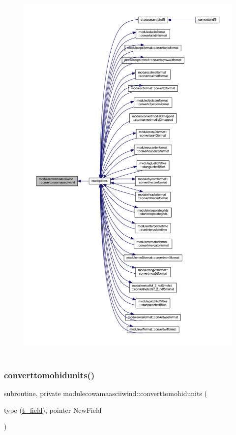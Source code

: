 \begin{figure}[H]
\begin{center}
\leavevmode
\includegraphics[height=550pt]{namespacemodulecowamaasciiwind_a76bf63c9a36126aed55309270f63abe4_icgraph}
\end{center}
\end{figure}
\mbox{\label{namespacemodulecowamaasciiwind_abd7579d6017af5f1f691051cd07a84a5}} 
\subsubsection{\texorpdfstring{converttomohidunits()}{converttomohidunits()}}
{\footnotesize\ttfamily subroutine, private modulecowamaasciiwind\+::converttomohidunits (\begin{DoxyParamCaption}\item[{type (\mbox{\hyperlink{structmodulecowamaasciiwind_1_1t__field}{t\+\_\+field}}), pointer}]{New\+Field }\end{DoxyParamCaption})\hspace{0.3cm}{\ttfamily [private]}}


